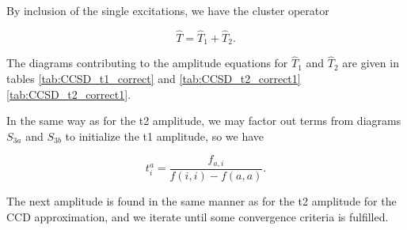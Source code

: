 By inclusion of the single excitations, we have the cluster operator

\begin{equation}
\hat{T} = \hat{T}_1 + \hat{T}_2.
\end{equation}

The diagrams contributing to the amplitude equations for $\hat{T}_1$ and  $\hat{T}_2$ are given in tables \ref{tab:CCSD_t1_correct} and \ref{tab:CCSD_t2_correct1}  \ref{tab:CCSD_t2_correct1}.

In the same way as for the t2 amplitude, we may factor out terms from diagrams $S_{3a}$ and $S_{3b}$ to initialize the t1 amplitude, so we have

\begin{equation}
t_i^a = \frac{f_{a,i}}{f(i,i) - f(a,a)}  .
\end{equation}

The next amplitude is found in the same manner as for the t2 amplitude for the CCD approximation, and we iterate until some convergence criteria is fulfilled.





